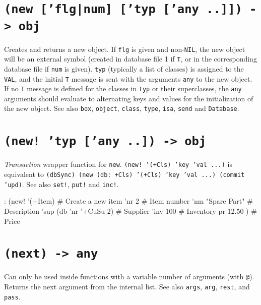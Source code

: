  
\section*{\texttt{(new ['flg|num] ['typ ['any ..]]) -> obj}}
\label{sec:func-ref-N-(new ['flg|num] ['typ ['any ..]]) -> obj}


Creates and returns a new object. If \texttt{flg} is given and non-\texttt{NIL}, the
new object will be an external symbol (created in database file 1 if
\texttt{T}, or in the corresponding database file if \texttt{num} is given). \texttt{typ}
(typically a list of classes) is assigned to the \texttt{VAL}, and the initial
\texttt{T} message is sent with the arguments \texttt{any} to the new object. If no
\texttt{T} message is defined for the classes in \texttt{typ} or their superclasses,
the \texttt{any} arguments should evaluate to alternating keys and values for
the initialization of the new object. See also \texttt{box}, \texttt{object}, \texttt{class},
\texttt{type}, \texttt{isa}, \texttt{send} and \texttt{Database}.



 
\section*{\texttt{(new! 'typ ['any ..]) -> obj}}
\label{sec:func-ref-N-(new! 'typ ['any ..]) -> obj}


\emph{Transaction} wrapper function for \texttt{new}.
\texttt{(new! '(+Cls) 'key 'val ...)} is equivalent to
\texttt{(dbSync) (new (db: +Cls) '(+Cls) 'key 'val ...) (commit 'upd)}. See
also \texttt{set!}, \texttt{put!} and \texttt{inc!}.


\begin{wideverbatim}
: (new! '(+Item)  # Create a new item
   'nr 2                      # Item number
   'nm "Spare Part"           # Description
   'sup (db 'nr '+CuSu 2)     # Supplier
   'inv 100                   # Inventory
   pr 12.50 )                 # Price
\end{wideverbatim}

 
\section*{\texttt{(next) -> any}}
\label{sec:func-ref-N-(next) -> any}


Can only be used inside functions with a variable number of arguments
(with \texttt{@}). Returns the next argument from the internal list. See also
\texttt{args}, \texttt{arg}, \texttt{rest}, and \texttt{pass}.


